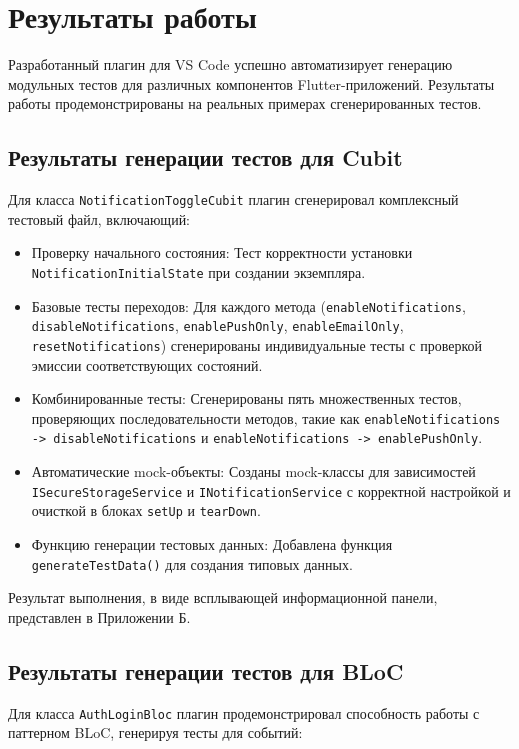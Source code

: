 \documentclass[14pt, russian]{scrartcl}
\begin{document}
\section{Результаты работы}

Разработанный плагин для VS Code успешно автоматизирует генерацию модульных тестов для различных компонентов Flutter-приложений. Результаты работы продемонстрированы на реальных примерах сгенерированных тестов.

\subsection{Результаты генерации тестов для Cubit}

Для класса \texttt{NotificationToggleCubit} плагин сгенерировал комплексный тестовый файл, включающий:

\begin{itemize}
    \item Проверку начального состояния: Тест корректности установки \texttt{NotificationInitialState} при создании экземпляра.
    \item Базовые тесты переходов: Для каждого метода (\texttt{enableNotifications}, \texttt{disableNotifications}, \texttt{enablePushOnly}, \texttt{enableEmailOnly}, \texttt{resetNotifications}) сгенерированы индивидуальные тесты с проверкой эмиссии соответствующих состояний.
    \item Комбинированные тесты: Сгенерированы пять множественных тестов, проверяющих последовательности методов, такие как \texttt{enableNotifications -> disableNotifications} и \texttt{enableNotifications -> enablePushOnly}.
    \item Автоматические mock-объекты: Созданы mock-классы для зависимостей \texttt{ISecureStorageService} и \texttt{INotificationService} с корректной настройкой и очисткой в блоках \texttt{setUp} и \texttt{tearDown}.
    \item Функцию генерации тестовых данных: Добавлена функция \texttt{generateTestData()} для создания типовых данных.
\end{itemize}

Результат выполнения, в виде всплывающей информационной панели, представлен в Приложении Б.

\subsection{Результаты генерации тестов для BLoC}

Для класса \texttt{AuthLoginBloc} плагин продемонстрировал способность работы с паттерном BLoC, генерируя тесты для событий:
\end{document}

